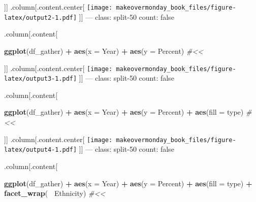 \documentclass[]{book}
\newenvironment{Shaded}{\begin{snugshade}}{\end{snugshade}}
\newcommand{\KeywordTok}[1]{\textcolor[rgb]{0.13,0.29,0.53}{\textbf{#1}}}
\newcommand{\DataTypeTok}[1]{\textcolor[rgb]{0.13,0.29,0.53}{#1}}
\newcommand{\StringTok}[1]{\textcolor[rgb]{0.31,0.60,0.02}{#1}}
\newcommand{\CommentTok}[1]{\textcolor[rgb]{0.56,0.35,0.01}{\textit{#1}}}
\newcommand{\OperatorTok}[1]{\textcolor[rgb]{0.81,0.36,0.00}{\textbf{#1}}}
\newcommand{\NormalTok}[1]{#1}
\theoremstyle{definition}
\theoremstyle{definition}
\theoremstyle{definition}
\theoremstyle{remark}
\begin{document}
{]}{]} .column{[}.content.center{[}
\texttt{[image: makeovermonday\_book\_files/figure-latex/output2-1.pdf]}
{]}{]} --- class: split-50 count: false

.column{[}.content{[}

\begin{Shaded}
\begin{Highlighting}[]
\KeywordTok{ggplot}\NormalTok{(df_gather) }\OperatorTok{+}
\StringTok{  }\KeywordTok{aes}\NormalTok{(}\DataTypeTok{x =}\NormalTok{ Year) }\OperatorTok{+}
\StringTok{  }\KeywordTok{aes}\NormalTok{(}\DataTypeTok{y =}\NormalTok{ Percent)  }\CommentTok{#<<}
\end{Highlighting}
\end{Shaded}

{]}{]} .column{[}.content.center{[}
\texttt{[image: makeovermonday\_book\_files/figure-latex/output3-1.pdf]}
{]}{]} --- class: split-50 count: false

.column{[}.content{[}

\begin{Shaded}
\begin{Highlighting}[]
\KeywordTok{ggplot}\NormalTok{(df_gather) }\OperatorTok{+}
\StringTok{  }\KeywordTok{aes}\NormalTok{(}\DataTypeTok{x =}\NormalTok{ Year) }\OperatorTok{+}
\StringTok{  }\KeywordTok{aes}\NormalTok{(}\DataTypeTok{y =}\NormalTok{ Percent) }\OperatorTok{+}
\StringTok{  }\KeywordTok{aes}\NormalTok{(}\DataTypeTok{fill =}\NormalTok{ type)  }\CommentTok{#<<}
\end{Highlighting}
\end{Shaded}

{]}{]} .column{[}.content.center{[}
\texttt{[image: makeovermonday\_book\_files/figure-latex/output4-1.pdf]}
{]}{]} --- class: split-50 count: false

.column{[}.content{[}

\begin{Shaded}
\begin{Highlighting}[]
\KeywordTok{ggplot}\NormalTok{(df_gather) }\OperatorTok{+}
\StringTok{  }\KeywordTok{aes}\NormalTok{(}\DataTypeTok{x =}\NormalTok{ Year) }\OperatorTok{+}
\StringTok{  }\KeywordTok{aes}\NormalTok{(}\DataTypeTok{y =}\NormalTok{ Percent) }\OperatorTok{+}
\StringTok{  }\KeywordTok{aes}\NormalTok{(}\DataTypeTok{fill =}\NormalTok{ type) }\OperatorTok{+}
\StringTok{  }\KeywordTok{facet_wrap}\NormalTok{(}\OperatorTok{~}\StringTok{ }\NormalTok{Ethnicity)  }\CommentTok{#<<}
\end{Highlighting}
\end{Shaded}
\end{document}
